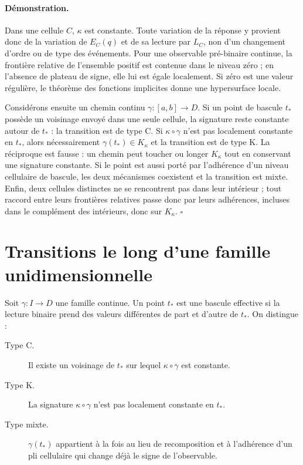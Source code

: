 \paragraph{Démonstration.}
Dans une cellule $C$, $\kappa$ est constante. Toute variation de la
réponse y provient donc de la variation de $E_C(q)$ et de sa lecture par
$L_C$, non d'un changement d'ordre ou de type des événements. Pour une
observable pré-binaire continue, la frontière relative de l'ensemble
positif est contenue dans le niveau zéro ; en l'absence de plateau de
signe, elle lui est égale localement. Si zéro est une valeur régulière,
le théorème des fonctions implicites donne une hypersurface locale.

Considérons ensuite un chemin continu $\gamma:[a,b]\to D$. Si un point
de bascule $t_*$ possède un voisinage envoyé dans une seule cellule, la
signature reste constante autour de $t_*$ : la transition est de type C.
Si $\kappa\circ\gamma$ n'est pas localement constante en $t_*$,
alors nécessairement $\gamma(t_*)\in K_\kappa$ et la transition est de
type K. La réciproque est fausse : un chemin peut toucher ou longer
$K_\kappa$ tout en conservant une signature constante. Si le point est
aussi porté par l'adhérence d'un niveau cellulaire de bascule, les deux
mécanismes coexistent et la transition est mixte.
Enfin, deux cellules distinctes ne se rencontrent pas dans leur intérieur ;
tout raccord entre leurs frontières relatives passe donc par leurs
adhérences, incluses dans le complément des intérieurs, donc sur
$K_\kappa$. \hfill$\square$

\section{Transitions le long d'une famille unidimensionnelle}
\label{annexe-J-chemins}

Soit $\gamma:I\to D$ une famille continue. Un point $t_*$ est une
bascule effective si la lecture binaire prend des valeurs différentes
de part et d'autre de $t_*$. On distingue :

\begin{description}
\item[Type C.] Il existe un voisinage de $t_*$ sur lequel
$\kappa\circ\gamma$ est constante.
\item[Type K.] La signature $\kappa\circ\gamma$ n'est pas localement
constante en $t_*$.
\item[Type mixte.] $\gamma(t_*)$ appartient à la fois au lieu de
recomposition et à l'adhérence d'un pli cellulaire qui change déjà le
signe de l'observable.
\end{description}

